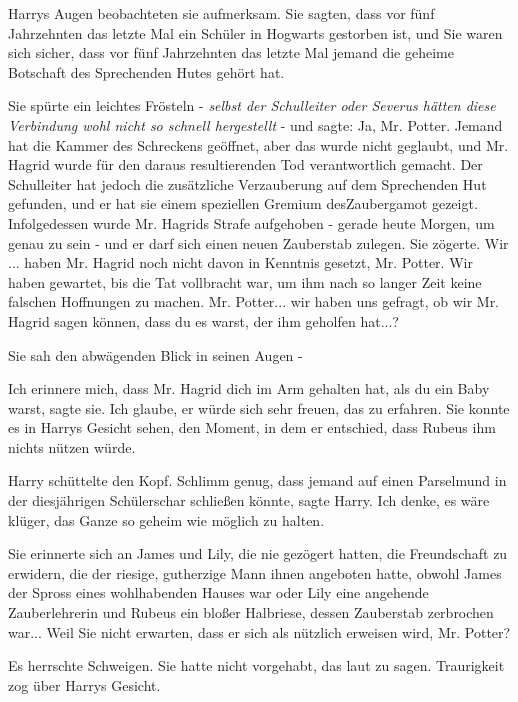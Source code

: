 Harrys Augen beobachteten sie aufmerksam. \glqq{}Sie sagten, dass vor fünf
Jahrzehnten das letzte Mal ein Schüler in Hogwarts gestorben ist, und Sie waren
sich sicher, dass vor fünf Jahrzehnten das letzte Mal jemand die geheime
Botschaft des Sprechenden Hutes gehört hat.\grqq{}

Sie spürte ein leichtes Frösteln - \emph{selbst der Schulleiter oder Severus
hätten diese Verbindung wohl nicht so schnell hergestellt} - und sagte: \glqq
Ja, Mr. Potter. Jemand hat die Kammer des Schreckens geöffnet, aber das wurde
nicht geglaubt, und Mr. Hagrid wurde für den daraus resultierenden Tod
verantwortlich gemacht. Der Schulleiter hat jedoch die zusätzliche Verzauberung
auf dem Sprechenden Hut gefunden, und er hat sie einem speziellen Gremium
desZaubergamot gezeigt. Infolgedessen wurde Mr. Hagrids Strafe aufgehoben -
gerade heute Morgen, um genau zu sein - und er darf sich einen neuen Zauberstab
zulegen.\grqq{} Sie zögerte. \glqq{}Wir ... haben Mr. Hagrid noch nicht davon in
Kenntnis gesetzt, Mr. Potter. Wir haben gewartet, bis die Tat vollbracht war, um
ihm nach so langer Zeit keine falschen Hoffnungen zu machen. Mr. Potter... wir
haben uns gefragt, ob wir Mr. Hagrid sagen können, dass du es warst, der ihm
geholfen hat...?\grqq{}

Sie sah den abwägenden Blick in seinen Augen -

\glqq{}Ich erinnere mich, dass Mr. Hagrid dich im Arm gehalten hat, als du ein
Baby warst\grqq{}, sagte sie. \glqq{}Ich glaube, er würde sich sehr freuen, das
zu erfahren.\grqq{} Sie konnte es in Harrys Gesicht sehen, den Moment, in dem er
entschied, dass Rubeus ihm nichts nützen würde.

Harry schüttelte den Kopf. \glqq{}Schlimm genug, dass jemand auf einen Parselmund
in der diesjährigen Schülerschar schließen könnte\grqq{}, sagte Harry. \glqq{}Ich
denke, es wäre klüger, das Ganze so geheim wie möglich zu halten.\grqq{}

Sie erinnerte sich an James und Lily, die nie gezögert hatten, die Freundschaft
zu erwidern, die der riesige, gutherzige Mann ihnen angeboten hatte, obwohl
James der Spross eines wohlhabenden Hauses war oder Lily eine angehende
Zauberlehrerin und Rubeus ein bloßer Halbriese, dessen Zauberstab zerbrochen
war... \glqq{}Weil Sie nicht erwarten, dass er sich als nützlich erweisen wird,
Mr. Potter?\grqq{}

Es herrschte Schweigen. Sie hatte nicht vorgehabt, das laut zu sagen.
Traurigkeit zog über Harrys Gesicht.


